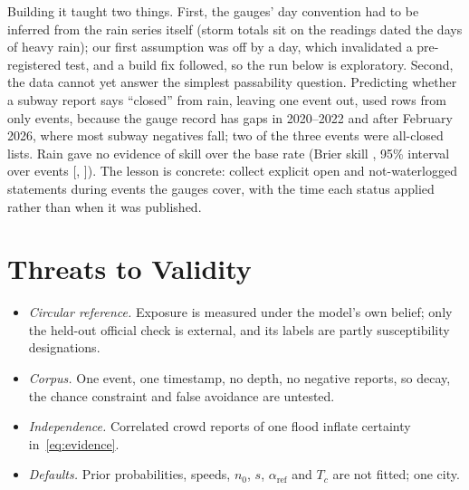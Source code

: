 \documentclass[conference]{IEEEtran}
\begin{document}
Building it taught two things. First, the gauges' day convention had to be inferred from the rain series itself (storm totals sit on the readings dated the days of heavy rain); our first assumption was off by a day, which invalidated a pre-registered test, and a build fix followed, so the run below is exploratory. Second, the data cannot yet answer the simplest passability question. Predicting whether a subway report says ``closed'' from rain, leaving one event out, used \BoneRows{} rows from only \BoneEvents{} events, because the gauge record has gaps in 2020--2022 and after February 2026, where most subway negatives fall; two of the three events were all-closed lists. Rain gave no evidence of skill over the base rate (Brier skill \BoneRainBss, 95\% interval over events [\BoneRainBsslo, \BoneRainBsshi]). The lesson is concrete: collect explicit open and not-waterlogged statements during events the gauges cover, with the time each status applied rather than when it was published.

\section{Threats to Validity}\label{sec:threats}
\begin{itemize}
\item \emph{Circular reference.} Exposure is measured under the model's own belief; only the held-out official check is external, and its labels are partly susceptibility designations.
\item \emph{Corpus.} One event, one timestamp, no depth, no negative reports, so decay, the chance constraint and false avoidance are untested.
\item \emph{Independence.} Correlated crowd reports of one flood inflate certainty in~\eqref{eq:evidence}.
\item \emph{Defaults.} Prior probabilities, speeds, $n_0$, $s$, $\alpha_{\mathrm{ref}}$ and $T_c$ are not fitted; one city.
\end{itemize}
\end{document}
